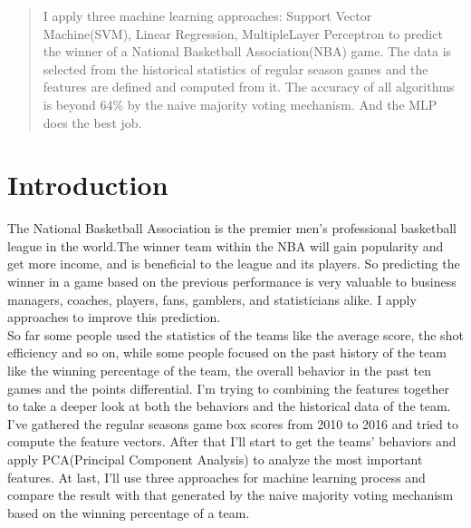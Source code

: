 \documentclass{article}
\begin{document}
 


\begin{abstract} 
I apply three machine learning approaches: Support Vector Machine(SVM), Linear Regression, MultipleLayer Perceptron to predict the winner of a National Basketball Association(NBA) game. The data is selected from the historical statistics of regular season games and the features are defined and computed from it. The accuracy of all algorithms is beyond 64\% by the naive majority voting mechanism. And the MLP does the best job.\end{abstract} 

\section{Introduction}
\label{submission}
The National Basketball Association is the premier men's professional basketball league in the world.The winner team within the NBA will gain popularity and get more income, and is beneficial to the league and its players. So predicting the winner in a game based on the previous performance is very valuable to business managers, coaches, players, fans, gamblers, and statisticians alike. I apply approaches to improve this prediction.\\
So far some people used the statistics of the teams like the average score, the shot efficiency and so on, while some people focused on the past history of the team like the winning percentage of the team, the overall behavior in the past ten games and the points differential. I'm trying to combining the features together to take a deeper look at both the behaviors and the historical data of the team.  I've gathered the regular seasons game box scores from 2010 to 2016 and tried to compute the feature vectors. After that I'll start to get the teams' behaviors and apply PCA(Principal Component Analysis) to analyze the most important features. At last, I'll use three approaches for machine learning process and compare the result with that generated by the naive majority voting mechanism based on the winning percentage of a team.
\end{document}
